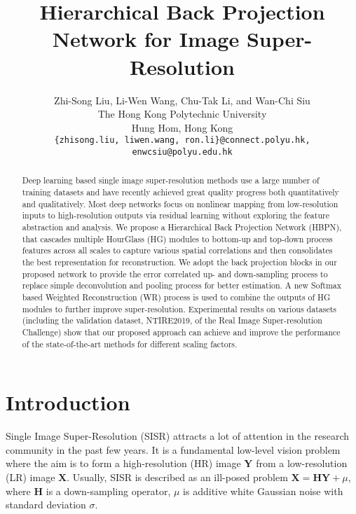 \documentclass[10pt,twocolumn,letterpaper]{article}
\begin{document}
\title{Hierarchical Back Projection Network for Image Super-Resolution}

\author{Zhi-Song Liu, Li-Wen Wang, Chu-Tak Li, and Wan-Chi Siu\\
The Hong Kong Polytechnic University\\
Hung Hom, Hong Kong\\
{\tt\small \{zhisong.liu, liwen.wang, ron.li\}@connect.polyu.hk, enwcsiu@polyu.edu.hk}
}

\maketitle
\thispagestyle{empty}

\begin{abstract}
   Deep learning based single image super-resolution methods use a large number of training datasets and have recently achieved great quality progress both quantitatively and qualitatively. Most deep networks focus on nonlinear mapping from low-resolution inputs to high-resolution outputs via residual learning without exploring the feature abstraction and analysis. We propose a Hierarchical Back Projection Network (HBPN), that cascades multiple HourGlass (HG) modules to bottom-up and top-down process features across all scales to capture various spatial correlations and then consolidates the best representation for reconstruction. We adopt the back projection blocks in our proposed network to provide the error correlated up- and down-sampling process to replace simple deconvolution and pooling process for better estimation. A new Softmax based Weighted Reconstruction (WR) process is used to combine the outputs of HG modules to further improve super-resolution. Experimental results on various datasets (including the validation dataset, NTIRE2019, of the Real Image Super-resolution Challenge) show that our proposed approach can achieve and improve the performance of the state-of-the-art methods for different scaling factors.
\end{abstract}

\section{Introduction}

Single Image Super-Resolution (SISR) attracts a lot of attention in the research community in the past few years. It is a fundamental low-level vision problem where the aim is to form a high-resolution (HR) image $\mathbf{Y}$ from a low-resolution (LR) image $\mathbf{X}$. Usually, SISR is described as an ill-posed problem $\mathbf{X}=\mathbf{H}\mathbf{Y}+\mu$, where $\mathbf{H}$ is a down-sampling operator, $\mu$ is additive white Gaussian noise with standard deviation $\sigma$. 
\end{document}
